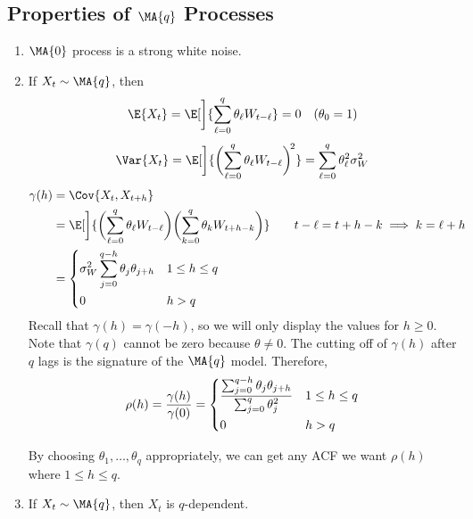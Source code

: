 \subsection*{Properties of $ \MA{q} $ Processes}
\begin{enumerate}[(1)]
    \item $ \MA{0} $ process is a strong white noise.
    \item If $ X_t\sim\MA{q} $, then
          \[ \E{X_t}=\E[\bigg]{\sum_{\ell=0}^{q} \theta_\ell W_{t-\ell}}=0\quad (\theta_0=1) \]
          \[ \Var{X_t}=\E[\bigg]{\biggl(\sum_{\ell=0}^{q} \theta_\ell W_{t-\ell}\biggr)^{\!2}}=
              \sum_{\ell=0}^{q} \theta_\ell^2\sigma_W^2 \]
          \begin{align*}
              \gamma(h)
                                                               & =\Cov{X_t,X_{t+h}}                                                                                \\
                                                               & =\E[\bigg]{\biggl(\sum_{\ell=0}^{q} \theta_\ell W_{t-\ell}\biggr)
              \biggl(\sum_{k=0}^{q} \theta_k W_{t+h-k}\biggr)} & \quad                                                             & t-\ell=t+h-k\implies k=\ell+h \\
                                                               & =\begin{dcases}
                  \sigma_W^2\sum_{j=0}^{q-h} \theta_j \theta_{j+h} & 1\le h\le q \\
                  0                                                & h>q
              \end{dcases}
          \end{align*}
          Recall that $ \gamma(h)=\gamma(-h) $, so we will only display the values
          for $ h\ge 0 $. Note that $ \gamma(q) $ cannot be zero
          because $ \theta\ne 0 $. The cutting off of $ \gamma(h) $
          after $ q $ lags is the signature of the $ \MA{q} $ model.
          Therefore,
          \[ \rho(h)=\frac{\gamma(h)}{\gamma(0)} =
              \begin{dcases}
                  \frac{\sum_{j=0}^{q-h} \theta_j \theta_{j+h}}{\sum_{j=0}^{q} \theta_j^2} & 1\le h\le q \\
                  0                                                                        & h>q
              \end{dcases} \]
          \begin{Remark}{}{}
              By choosing $ \theta_1,\ldots,\theta_q $ appropriately, we can
              get any ACF we want $ \rho(h) $ where $ 1\le h\le q $.
          \end{Remark}
    \item If $ X_t\sim\MA{q} $, then $ X_t $ is $ q $-dependent.
\end{enumerate}
